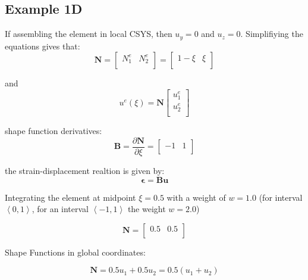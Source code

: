 \documentclass[10pt,b5paper,titlepage]{book}
\newcommand{\m}{\mathbf}
\newcommand{\M}{\pmb}
\begin{document}
\subsection{Example 1D}
If assembling the element in local CSYS, then $ u_y = 0 $ and $ u_z = 0 $.
Simplifiying the equations gives that:
\begin{equation}
    \m{N} = \begin{bmatrix}
        N_1^e & N_2^e \\
    \end{bmatrix}
    = \begin{bmatrix}
        1 - \xi & \xi \\
    \end{bmatrix}
\end{equation}

and
\begin{equation}
    u^e(\xi) = \m{N} \begin{bmatrix}
        u_1^e \\
        u_2^e \\
    \end{bmatrix}
\end{equation}

shape function derivatives:
\begin{equation}
    \m{B} = \frac{\partial \m{N}}{\partial \xi} =
    \begin{bmatrix}
        -1 & 1 \\
    \end{bmatrix}
\end{equation}

the strain-displacement realtion is given by:
\begin{equation}
    \M{\epsilon} = \m{B} \m{u}
\end{equation}

Integrating the element at midpoint $ \xi = 0.5 $ with a weight of $ w = 1.0 $
(for interval $ \left< 0, 1 \right> $, for an interval
$ \left< -1,  1 \right> $ the weight $ w = 2.0 $)

\begin{equation}
    \m{N} = \begin{bmatrix}
        0.5 & 0.5 \\
    \end{bmatrix}
\end{equation}

Shape Functions in global coordinates:

\begin{equation}
    \m{N} = 0.5 u_1 + 0.5 u_2 = 0.5 (u_1 + u_2)
\end{equation}
\end{document}
